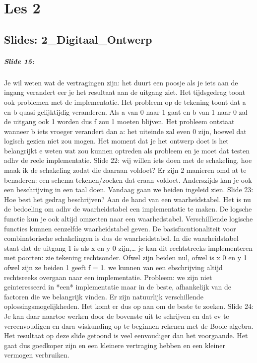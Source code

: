 \documentclass[10pt,a4paper]{book}
\begin{document}
\chapter{Les 2}
\section{Slides: 2\_Digitaal\_Ontwerp}

\paragraph{Slide 15:} Je wil weten wat de vertragingen zijn: het duurt een poosje als je iets aan de ingang verandert eer je het resultaat aan de uitgang ziet. Het tijdsgedrag toont ook problemen met de implementatie. Het probleem op de tekening toont dat a en b quasi gelijktijdig veranderen. Als a van 0 naar 1 gaat en b van 1 naar 0 zal de uitgang ook 1 worden dus f zou 1 moeten blijven. Het probleem ontstaat wanneer b iets vroeger verandert dan a: het uiteinde zal even 0 zijn, hoewel dat logisch gezien niet zou mogen. Het moment dat je het ontwerp doet is het belangrijkt e weten wat zou kunnen optreden als probleem en je moet dat testen adhv de reele implementatie.
Slide 22: wij willen iets doen met de schakeling, hoe maak ik de schakeling zodat die daaraan voldoet? Er zijn 2 manieren omd at te benaderen: een schema tekenen/zoeken dat eraan voldoet. Anderszijds kan je ook een beschrijving in een taal doen.
Vandaag gaan we beiden ingeleid zien.
Slide 23: Hoe best het gedrag beschrijven? Aan de hand van een waarheidstabel. Het is nu de bedoeling om adhv de waarheidstabel een implementatie te maken. De logsche functie kun je ook altijd omzetten naar een waarhedstabel. Verschilllende logische functies kunnen eenzelfde waarheidstabel geven. De basisfucntionaliteit voor combinatorische schakelingen is dus de waarheidstabel.
In die waarheidstabel staat dat de uitgang 1 is als x en y 0 zijn,… je kan dit rechtstreeks implementeren met poorten: zie tekening rechtsonder.
Ofwel zijn beiden nul, ofwel is x 0 en y 1 ofwel zijn ze beiden 1 geeft f = 1. we kunnen van een ebschrijving altijd rechtsreeks overgaan naar een implementatie. Probleem: we zijn niet geinteresseerd in *een* implementatie maar in de beste, afhankelijk van de factoren die we belangrijk vinden.
Er zijn natuurlijk verschillende oplossingsmogelijkheden. Het komt er dus op aan om de beste te zoeken.
Slide 24: Je kan daar naartoe werken door de bovenste uit te schrijven en dat ev te vereenvoudigen en dara wiskunding op te beginnen rekenen met de Boole algebra. Het resultaat op deze slide getoond is veel eenvoudiger dan het voorgaande. Het gaat dus goedkoper zijn en een kleinere vertraging hebben en een kleiner vermogen verbruiken.
\end{document}
